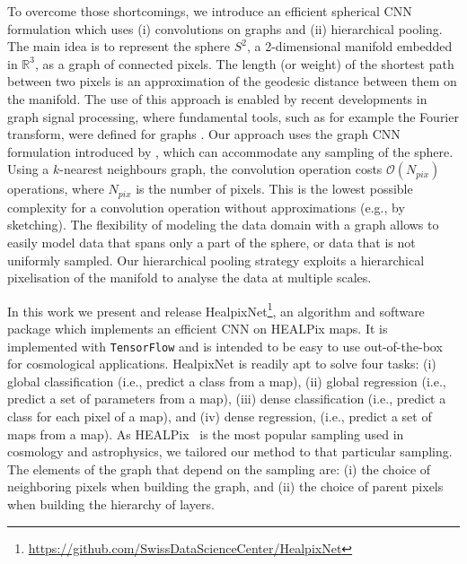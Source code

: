 \documentclass[final,twocolumn,3p,times,authoryear]{elsarticle}
\newcommand{\nati}[1]{{\color[rgb]{.1,.6,.1}{#1}}}
\newcommand{\TK}[1]{{\color{red}{TK:#1}}}
\newcommand{\todo}[1]{{\color[rgb]{.6,.1,.6}{#1}}}
\newcommand{\1}{\b{1}}              %
\newcommand{\0}{\b{0}}              %
\newcommand{\pkg}[1]{\texttt{#1}}
\begin{document}
To overcome those shortcomings, we introduce an efficient spherical CNN formulation which uses (i) convolutions on graphs and (ii) hierarchical pooling.
The main idea is to represent the sphere $S^2$, a 2-dimensional manifold embedded in $\mathbb{R}^3$, as a graph of connected pixels.
The length (or weight) of the shortest path between two pixels is an approximation of the geodesic distance between them on the manifold.
The use of this approach is enabled by recent developments in graph signal processing, where fundamental tools, such as for example the Fourier transform, were defined for graphs \citep{shuman2013emerging}.
Our approach uses the graph CNN formulation introduced by \citet{defferrard2016convolutional}, which can accommodate any sampling of the sphere.
Using a $k$-nearest neighbours graph, the convolution operation costs $\mathcal{O}(N_{pix})$ operations, where $N_{pix}$ is the number of pixels.
This is the lowest possible complexity for a convolution operation without approximations (e.g., by sketching).
The flexibility of modeling the data domain with a graph allows to easily model data that spans only a part of the sphere, or data that is not uniformly sampled.
Our hierarchical pooling strategy exploits a hierarchical pixelisation of the manifold to analyse the data at multiple scales.

In this work we present and release HealpixNet\footnote{\url{https://github.com/SwissDataScienceCenter/HealpixNet}}, an algorithm and software package which implements an efficient CNN on HEALPix maps. It is implemented with \pkg{TensorFlow} \citep{abadi2016tensorflow} and is intended to be easy to use out-of-the-box for cosmological applications.
HealpixNet is readily apt to solve four tasks: (i) global classification (i.e., predict a class from a map), (ii) global regression (i.e., predict a set of parameters from a map), (iii) dense classification (i.e., predict a class for each pixel of a map), and (iv) dense regression, (i.e., predict a set of maps from a map).
As HEALPix~\citep{gorski2005healpix} is the most popular sampling used in cosmology and astrophysics, we tailored our method to that particular sampling.
The elements of the graph that depend on the sampling are:
(i) the choice of neighboring pixels when building the graph, and
(ii) the choice of parent pixels when building the hierarchy of layers.
\end{document}
